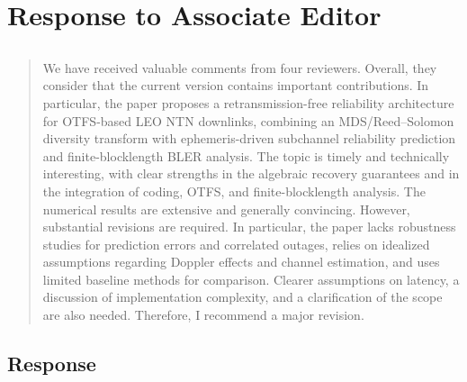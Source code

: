 \section*{Response to Associate Editor}

\subsection{}
\begin{mdframed}
\begin{quote}
We have received valuable comments from four reviewers. Overall, they consider that the current version contains important contributions. In particular, the paper proposes a retransmission-free reliability architecture for OTFS-based LEO NTN downlinks, combining an MDS/Reed--Solomon diversity transform with ephemeris-driven subchannel reliability prediction and finite-blocklength BLER analysis. The topic is timely and technically interesting, with clear strengths in the algebraic recovery guarantees and in the integration of coding, OTFS, and finite-blocklength analysis. The numerical results are extensive and generally convincing. However, substantial revisions are required. In particular, the paper lacks robustness studies for prediction errors and correlated outages, relies on idealized assumptions regarding Doppler effects and channel estimation, and uses limited baseline methods for comparison. Clearer assumptions on latency, a discussion of implementation complexity, and a clarification of the scope are also needed. Therefore, I recommend a major revision.
\end{quote}
\end{mdframed}

\subsection{Response}

